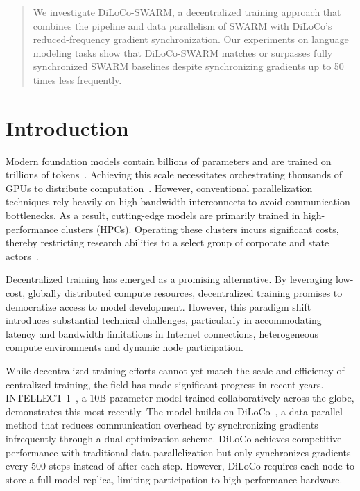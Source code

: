 \documentclass{article}
\begin{document}
\begin{abstract}
  We investigate DiLoCo-SWARM, a decentralized training approach that combines
  the pipeline and data parallelism of SWARM with DiLoCo's reduced-frequency
  gradient synchronization. Our experiments on language modeling tasks show that
  DiLoCo-SWARM matches or surpasses fully synchronized SWARM baselines despite
  synchronizing gradients up to 50 times less frequently.
\end{abstract}

\section{Introduction}

Modern foundation models contain billions of parameters and are trained on trillions of tokens~\cite{chowdhery2022palm,brown2023gpt3,dubey2024llama3,google2024gemini}. Achieving this scale necessitates orchestrating thousands of GPUs to distribute computation~\cite{dubey2024llama3,deepseekai2024}. However, conventional parallelization techniques rely heavily on high-bandwidth interconnects to avoid communication bottlenecks. As a result, cutting-edge models are primarily trained in high-performance clusters (HPCs). Operating these clusters incurs significant costs, thereby restricting research abilities to a select group of corporate and state actors~\cite{jaghouar2024intellect1}.

Decentralized training has emerged as a promising alternative. By leveraging low-cost, globally distributed compute resources, decentralized training promises to democratize access to model development. However, this paradigm shift introduces substantial technical challenges, particularly in accommodating latency and bandwidth limitations in Internet connections, heterogeneous compute environments and dynamic node participation.

While decentralized training efforts cannot yet match the 
scale and efficiency of centralized training, the field 
has made significant progress in recent years. INTELLECT-1~\cite{jaghouar2024intellect1}, a 10B parameter model trained collaboratively across the globe, demonstrates this most recently. The model builds on DiLoCo~\cite{douillard2023diloco}, a data parallel method that reduces communication overhead by synchronizing gradients infrequently through a dual optimization scheme. DiLoCo achieves competitive performance with traditional data parallelization but only synchronizes gradients every 500 steps instead of after each step. However, DiLoCo requires each node to store a full model replica, limiting participation to high-performance hardware.
\end{document}
